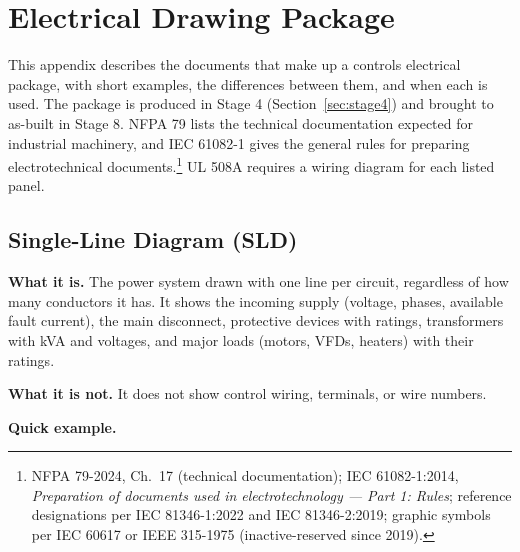 \chapter{Electrical Drawing Package}
\label{app:drawing-package}
This appendix describes the documents that make up a controls electrical package, with short examples, the differences between them, and when each is used. The package is produced in Stage 4 (Section~\ref{sec:stage4}) and brought to as-built in Stage 8. NFPA 79 lists the technical documentation expected for industrial machinery, and IEC 61082-1 gives the general rules for preparing electrotechnical documents.\footnote{NFPA 79-2024, Ch.~17 (technical documentation); IEC 61082-1:2014, \emph{Preparation of documents used in electrotechnology --- Part 1: Rules}; reference designations per IEC 81346-1:2022 and IEC 81346-2:2019; graphic symbols per IEC 60617 or IEEE 315-1975 (inactive-reserved since 2019).} UL 508A requires a wiring diagram for each listed panel.

\section{Single-Line Diagram (SLD)}
\textbf{What it is.} The power system drawn with one line per circuit, regardless of how many conductors it has. It shows the incoming supply (voltage, phases, available fault current), the main disconnect, protective devices with ratings, transformers with kVA and voltages, and major loads (motors, VFDs, heaters) with their ratings.

\textbf{What it is not.} It does not show control wiring, terminals, or wire numbers.

\textbf{Quick example.}
\begin{center}
\end{center}

